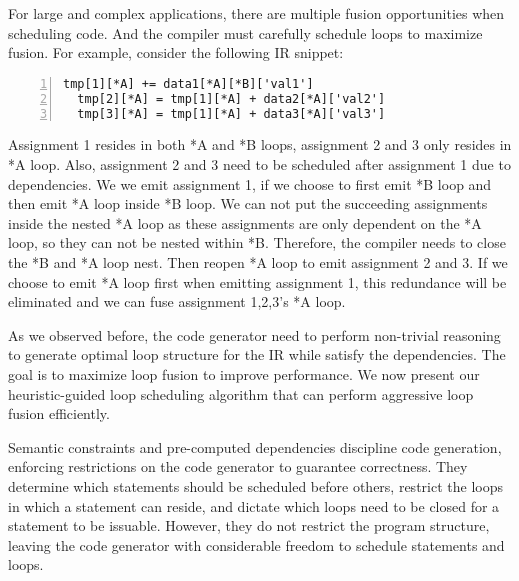\documentclass[sigplan, nonacm]{acmart}\settopmatter{printfolios=true,printccs=false,printacmref=false}
\begin{document}
For large and complex applications, there are multiple fusion opportunities when scheduling code. And the compiler must carefully schedule loops to maximize fusion. For example, consider the following IR snippet:
\begin{lstlisting}[numbers=left]
  tmp[1][*A] += data1[*A][*B]['val1']
  tmp[2][*A] = tmp[1][*A] + data2[*A]['val2']
  tmp[3][*A] = tmp[1][*A] + data3[*A]['val3']
  \end{lstlisting}
Assignment 1 resides in both *A and *B loops, assignment 2 and 3 only resides in *A loop. Also, assignment 2 and 3 need to be scheduled after assignment 1 due to dependencies. We we emit assignment 1, if we choose to first emit *B loop and then emit *A loop inside *B loop. We can not put the succeeding assignments inside the nested *A loop as these assignments are only dependent on the *A loop, so they can not be nested within *B. Therefore, the compiler needs to close the *B and *A loop nest. Then reopen *A loop to emit assignment 2 and 3. If we choose to emit *A loop first when emitting assignment 1, this redundance will be eliminated and we can fuse assignment 1,2,3's *A loop.\par
As we observed before, the code generator need to perform non-trivial reasoning to generate optimal loop structure for the IR while satisfy the dependencies. The goal is to maximize loop fusion to improve performance. We now present our heuristic-guided loop scheduling algorithm that can perform aggressive loop fusion efficiently.\par
\fi
Semantic constraints and pre-computed dependencies discipline code generation, enforcing restrictions on the code generator to guarantee correctness. They determine which statements should be scheduled before others, restrict the loops in which a statement can reside, and dictate which loops need to be closed for a statement to be issuable. However, they do not restrict the program structure, leaving the code generator with considerable freedom to schedule statements and loops.
\end{document}
